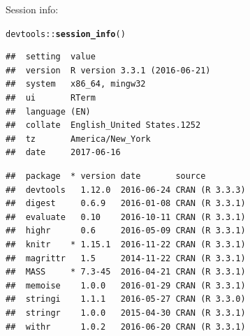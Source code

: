 \documentclass{article}\usepackage[]{graphicx}\usepackage[]{color}
\makeatletter
\newcommand{\hlopt}[1]{\textcolor[rgb]{0,0,0}{#1}}%
\newcommand{\hlstd}[1]{\textcolor[rgb]{0.345,0.345,0.345}{#1}}%
\newcommand{\hlkwd}[1]{\textcolor[rgb]{0.737,0.353,0.396}{\textbf{#1}}}%
\newenvironment{kframe}{%
 \def\at@end@of@kframe{}%
 \ifinner\ifhmode%
  \def\at@end@of@kframe{\end{minipage}}%
  \begin{minipage}{\columnwidth}%
 \fi\fi%
 \def\FrameCommand##1{\hskip\@totalleftmargin \hskip-\fboxsep
 \colorbox{shadecolor}{##1}\hskip-\fboxsep
     \hskip-\linewidth \hskip-\@totalleftmargin \hskip\columnwidth}%
 \MakeFramed {\advance\hsize-\width
   \@totalleftmargin\z@ \linewidth\hsize
   \@setminipage}}%
 {\par\unskip\endMakeFramed%
 \at@end@of@kframe}
\newenvironment{knitrout}{}{} %
\makeatother
\begin{document}
Session info:
\begin{knitrout}
\color{fgcolor}\begin{kframe}
\begin{alltt}
\hlstd{devtools}\hlopt{::}\hlkwd{session_info}\hlstd{()}
\end{alltt}


{\ttfamily\noindent\itshape\color{messagecolor}{\#\# Session info -----------------------------------------------}}\begin{verbatim}
##  setting  value                       
##  version  R version 3.3.1 (2016-06-21)
##  system   x86_64, mingw32             
##  ui       RTerm                       
##  language (EN)                        
##  collate  English_United States.1252  
##  tz       America/New_York            
##  date     2017-06-16
\end{verbatim}


{\ttfamily\noindent\itshape\color{messagecolor}{\#\# Packages ---------------------------------------------------}}\begin{verbatim}
##  package  * version date       source        
##  devtools   1.12.0  2016-06-24 CRAN (R 3.3.3)
##  digest     0.6.9   2016-01-08 CRAN (R 3.3.1)
##  evaluate   0.10    2016-10-11 CRAN (R 3.3.1)
##  highr      0.6     2016-05-09 CRAN (R 3.3.1)
##  knitr    * 1.15.1  2016-11-22 CRAN (R 3.3.1)
##  magrittr   1.5     2014-11-22 CRAN (R 3.3.1)
##  MASS     * 7.3-45  2016-04-21 CRAN (R 3.3.1)
##  memoise    1.0.0   2016-01-29 CRAN (R 3.3.1)
##  stringi    1.1.1   2016-05-27 CRAN (R 3.3.0)
##  stringr    1.0.0   2015-04-30 CRAN (R 3.3.1)
##  withr      1.0.2   2016-06-20 CRAN (R 3.3.1)
\end{verbatim}
\end{kframe}
\end{knitrout}
\end{document}
